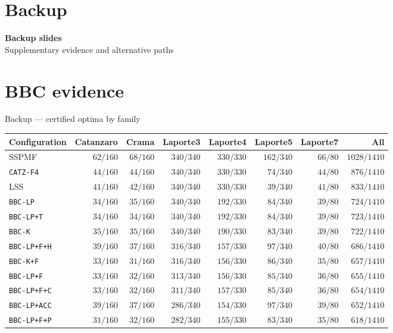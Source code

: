 \documentclass[aspectratio=169,10pt]{beamer}
\begin{document}
\section*{Backup}

\begin{frame}[plain]
\vfill
\begingroup\centering
{\Large\color{navy}\textbf{Backup slides}}\\[.55cm]
{\normalsize Supplementary evidence and alternative paths}
\par\endgroup
\vfill
\end{frame}

\section*{BBC evidence}

\begin{frame}{Backup --- certified optima by family}
\vspace{0.09cm}
\centering
{\scriptsize
\setlength{\tabcolsep}{4pt}
\begin{tabular}{@{}lrrrrrrr@{}}
\toprule
Configuration & Catanzaro & Crama & Laporte3 & Laporte4 & Laporte5 & Laporte7 & All\\
\midrule
SSPMF              & $62/160$ & $68/160$ & $340/340$ & $330/330$ & $162/340$ & $66/80$ & $1028/1410$\\
\texttt{CATZ-F4}   & $44/160$ & $44/160$ & $340/340$ & $330/330$ & $74/340$  & $44/80$ & $876/1410$\\
LSS                & $41/160$ & $42/160$ & $340/340$ & $330/330$ & $39/340$  & $41/80$ & $833/1410$\\
\midrule
\texttt{BBC-LP}    & $34/160$ & $35/160$ & $340/340$ & $192/330$ & $84/340$  & $39/80$ & $724/1410$\\
\texttt{BBC-LP+T}  & $34/160$ & $34/160$ & $340/340$ & $192/330$ & $84/340$  & $39/80$ & $723/1410$\\
\texttt{BBC-K}     & $35/160$ & $35/160$ & $340/340$ & $190/330$ & $83/340$  & $39/80$ & $722/1410$\\
\texttt{BBC-LP+F+H}& $39/160$ & $37/160$ & $316/340$ & $157/330$ & $97/340$  & $40/80$ & $686/1410$\\
\texttt{BBC-K+F}   & $33/160$ & $31/160$ & $316/340$ & $156/330$ & $86/340$  & $35/80$ & $657/1410$\\
\texttt{BBC-LP+F}  & $33/160$ & $32/160$ & $313/340$ & $156/330$ & $85/340$  & $36/80$ & $655/1410$\\
\texttt{BBC-LP+F+C}& $33/160$ & $32/160$ & $311/340$ & $157/330$ & $85/340$  & $36/80$ & $654/1410$\\
\texttt{BBC-LP+ACC}& $39/160$ & $37/160$ & $286/340$ & $154/330$ & $97/340$  & $39/80$ & $652/1410$\\
\texttt{BBC-LP+F+P}& $31/160$ & $32/160$ & $282/340$ & $155/330$ & $83/340$  & $35/80$ & $618/1410$\\
\bottomrule
\end{tabular}}


\end{frame}
\end{document}
